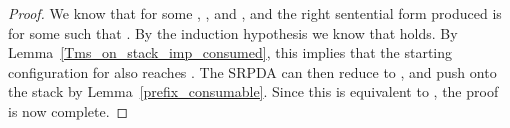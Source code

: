 \begin{isabellebody}
\begin{isamarkuptext}
\begin{lemma}
\begin{proof}
We know that  for some , , and , and the 
right sentential form produced is  for some  such that 
. By the induction hypothesis we know that 
 holds.
By Lemma~\ref{Tms_on_stack_imp_consumed}, this implies that the starting configuration for  also 
reaches . The SRPDA can then reduce
 to , and push  onto the stack by
Lemma~\ref{prefix_consumable}. Since this is equivalent to , the proof is now complete.
\end{proof}
\end{lemma}


\end{isamarkuptext}
\end{isabellebody}
